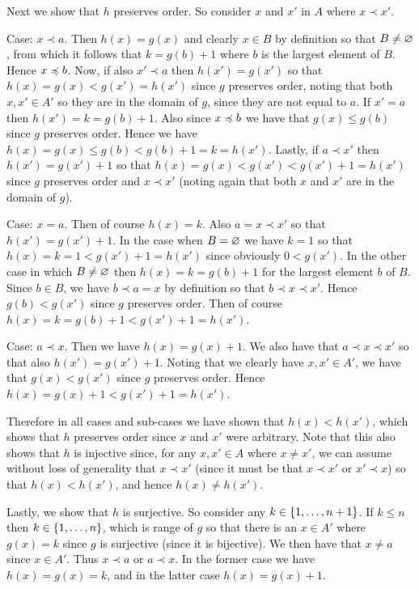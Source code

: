 {{    Next we show that $h$ preserves order.
    So consider $x$ and $x'$ in $A$ where $x \prec x'$.

    Case: $x \prec a$.
    Then $h(x) = g(x)$ and clearly $x \in B$ by definition so that $B \neq \varnothing$, from which it follows that $k = g(b)+1$ where $b$ is the largest element of $B$.
    Hence $x \preccurlyeq b$.
    Now, if also $x' \prec a$ then $h(x') = g(x')$ so that $h(x) = g(x) < g(x') = h(x')$ since $g$ preserves order, noting that both $x,x' \in A'$ so they are in the domain of $g$, since they are not equal to $a$.
    If $x' = a$ then $h(x') = k = g(b)+1$.
    Also since $x \preccurlyeq b$ we have that $g(x) \leq g(b)$ since $g$ preserves order.
    Hence we have $h(x) = g(x) \leq g(b) < g(b)+1 = k = h(x')$.
    Lastly, if $a \prec x'$ then $h(x') = g(x')+1$ so that $h(x) = g(x) < g(x') < g(x')+1 = h(x')$ since $g$ preserves order and $x \prec x'$ (noting again that both $x$ and $x'$ are in the domain of $g$).

    Case: $x = a$.
    Then of course $h(x) = k$.
    Also $a = x \prec x'$ so that $h(x') = g(x')+1$.
    In the case when $B = \varnothing$ we have $k=1$ so that $h(x) = k = 1 < g(x')+1 = h(x')$ since obviously $0 < g(x')$.
    In the other case in which $B \neq \varnothing$ then $h(x) = k = g(b)+1$ for the largest element $b$ of $B$.
    Since $b \in B$, we have $b \prec a = x$ by definition so that $b \prec x \prec x'$.
    Hence $g(b) < g(x')$ since $g$ preserves order.
    Then of course $h(x) = k = g(b)+1 < g(x')+1 = h(x')$.

    Case: $a \prec x$.
    Then we have $h(x) = g(x)+1$.
    We also have that $a \prec x \prec x'$ so that also $h(x') = g(x')+1$.
    Noting that we clearly have $x,x' \in A'$, we have that $g(x) < g(x')$ since $g$ preserves order.
    Hence $h(x) = g(x)+1 < g(x')+1 = h(x')$.

    Therefore in all cases and sub-cases we have shown that $h(x) < h(x')$, which shows that $h$ preserves order since $x$ and $x'$ were arbitrary.
    Note that this also shows that $h$ is injective since, for any $x,x' \in A$ where $x \neq x'$, we can assume without loss of generality that $x \prec x'$ (since it must be that $x \prec x'$ or $x' \prec x$) so that $h(x) < h(x')$, and hence $h(x) \neq h(x')$.

    Lastly, we show that $h$ is surjective.
    So consider any $k \in \left\{ 1, \ldots, n+1 \right\}$.
    If $k \leq n$ then $k \in \left\{ 1, \ldots, n \right\}$, which is range of $g$ so that there is an $x \in A'$ where $g(x) = k$ since $g$ is surjective (since it is bijective).
    We then have that $x \neq a$ since $x \in A'$.
    Thus $x \prec a$ or $a \prec x$.
    In the former case we have $h(x) = g(x) = k$, and in the latter case $h(x) = g(x)+1$.
  }
}
